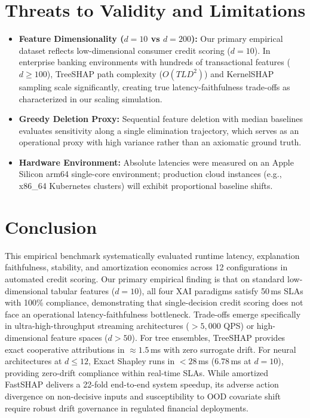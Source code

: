 \documentclass[conference]{IEEEtran}
\begin{document}
\section{Threats to Validity and Limitations}
\begin{itemize}
    \item \textbf{Feature Dimensionality ($d=10$ vs $d=200$):} Our primary empirical dataset reflects low-dimensional consumer credit scoring ($d=10$). In enterprise banking environments with hundreds of transactional features ($d \ge 100$), TreeSHAP path complexity ($O(TLD^2)$) and KernelSHAP sampling scale significantly, creating true latency-faithfulness trade-offs as characterized in our scaling simulation.
    \item \textbf{Greedy Deletion Proxy:} Sequential feature deletion with median baselines evaluates sensitivity along a single elimination trajectory, which serves as an operational proxy with high variance rather than an axiomatic ground truth.
    \item \textbf{Hardware Environment:} Absolute latencies were measured on an Apple Silicon arm64 single-core environment; production cloud instances (e.g., x86\_64 Kubernetes clusters) will exhibit proportional baseline shifts.
\end{itemize}

\section{Conclusion}
This empirical benchmark systematically evaluated runtime latency, explanation faithfulness, stability, and amortization economics across 12 configurations in automated credit scoring. 
Our primary empirical finding is that on standard low-dimensional tabular features ($d=10$), all four XAI paradigms satisfy 50\,ms SLAs with 100\% compliance, demonstrating that single-decision credit scoring does not face an operational latency-faithfulness bottleneck. 
Trade-offs emerge specifically in ultra-high-throughput streaming architectures ($>5,000$ QPS) or high-dimensional feature spaces ($d > 50$). 
For tree ensembles, TreeSHAP provides exact cooperative attributions in $\approx 1.5$\,ms with zero surrogate drift. For neural architectures at $d \le 12$, Exact Shapley runs in $<28$\,ms ($6.78$\,ms at $d=10$), providing zero-drift compliance within real-time SLAs. While amortized FastSHAP delivers a 22-fold end-to-end system speedup, its adverse action divergence on non-decisive inputs and susceptibility to OOD covariate shift require robust drift governance in regulated financial deployments.
\end{document}
